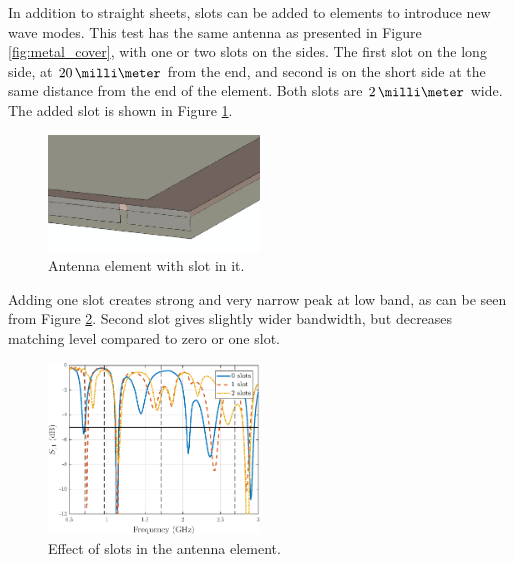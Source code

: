 In addition to straight sheets, slots can be added to elements to introduce new wave modes. This test has the same antenna as presented in Figure \ref{fig:metal_cover}, with one or two slots on the sides. The first slot on the long side, at $20\,\milli\meter$ from the end, and second is on the short side at the same distance from the end of the element. Both slots are $2\,\milli\meter$ wide. The added slot is shown in Figure \ref{fig:slot}.
\begin{figure}[H]
    \centering
    \includegraphics[width=0.5\textwidth]{img/slot.eps}
    \caption{Antenna element with slot in it.}
    \label{fig:slot}
\end{figure}

Adding one slot creates strong and very narrow peak at low band, as can be seen from Figure \ref{fig:slot_res}. Second slot gives slightly wider bandwidth, but decreases matching level compared to zero or one slot.

\begin{figure}[H]
    \centering
    \includegraphics[width=0.5\textwidth]{img/slot_res.eps}
    \caption{Effect of slots in the antenna element.}
    \label{fig:slot_res}
\end{figure}

